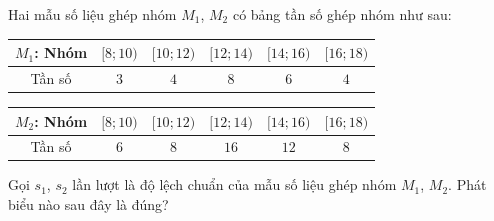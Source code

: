 \begin{ex}
Hai mẫu số liệu ghép nhóm $M_1$, $M_2$ có bảng tần số ghép nhóm như sau:
\begin{center}
\renewcommand{\arraystretch}{1.25}
\begin{tabular}{|c|c|c|c|c|c|}
\hline
$M_1$: Nhóm & $[8;10)$ & $[10;12)$ & $[12;14)$ & $[14;16)$ & $[16;18)$ \\
\hline
Tần số & $3$ & $4$ & $8$ & $6$ & $4$ \\
\hline
\end{tabular}

\medskip
\begin{tabular}{|c|c|c|c|c|c|}
\hline
$M_2$: Nhóm & $[8;10)$ & $[10;12)$ & $[12;14)$ & $[14;16)$ & $[16;18)$ \\
\hline
Tần số & $6$ & $8$ & $16$ & $12$ & $8$ \\
\hline
\end{tabular}
\end{center}
Gọi $s_1$, $s_2$ lần lượt là độ lệch chuẩn của mẫu số liệu ghép nhóm $M_1$, $M_2$. Phát biểu nào sau đây là đúng?
\end{ex}
